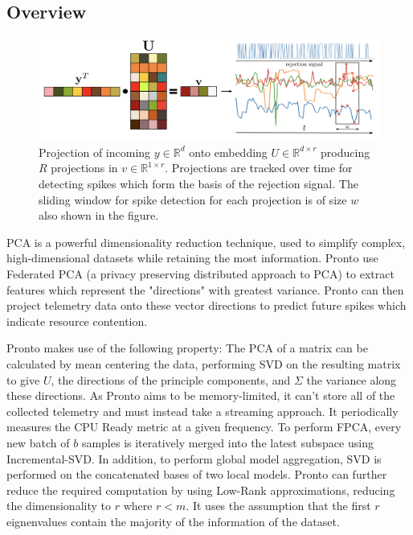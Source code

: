 \subsection{Overview}
\label{pronto-overview}

\begin{figure}[h]
    \centering
    \includegraphics[width=\textwidth]{images/pronto}
    \caption{Projection of incoming $y \in \mathbb{R}^d$ onto embedding $U \in
    \mathbb{R}^{d \times r}$ producing $R$ projections in $v \in \mathbb{R}^{1
    \times r}$. Projections are tracked over time for detecting spikes which
    form the basis of the rejection signal. The sliding window for spike
    detection for each projection is of size $w$ also shown in the figure.}
    \label{pronto-components}
\end{figure}

PCA is a powerful dimensionality reduction technique, used to simplify
complex, high-dimensional datasets while retaining the most information. Pronto
use Federated PCA (a privacy preserving distributed approach to PCA) to extract
features which represent the "directions" with greatest variance. Pronto can
then project telemetry data onto these vector directions to predict future
spikes which indicate resource contention.

Pronto makes use of the following property: The PCA of a matrix can be
calculated by mean centering the data, performing SVD on the resulting matrix to
give $U$, the directions of the principle components, and $\Sigma$ the variance
along these directions. As Pronto aims to be memory-limited, it can't store all
of the collected telemetry and must instead take a streaming approach. It
periodically measures the CPU Ready metric at a given frequency. To perform
FPCA, every new batch of $b$ samples is iteratively merged into the latest
subspace using Incremental-SVD. In addition, to perform global model
aggregation, SVD is performed on the concatenated bases of two local models.
Pronto can further reduce the required computation by using Low-Rank
approximations, reducing the dimensionality to $r$ where $r < m$. It uses the
assumption that the first $r$ eignenvalues contain the majority of the
information of the dataset.


